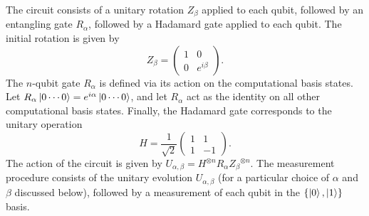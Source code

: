 \documentclass[amsmath,amssymb,superscriptaddress,twocolumn,pra]{revtex4-1}
\begin{document}
The circuit consists of a unitary rotation $Z_{\beta}$ applied to each qubit, followed by an entangling gate $R_{\alpha}$, followed by a Hadamard gate applied to each qubit. The initial rotation is given by
\begin{equation}
Z_\beta = \begin{pmatrix}1 & 0 \\ 0 & e^{i\beta}\end{pmatrix}.
\end{equation}
The $n$-qubit gate $R_\alpha$ is defined via its action on the computational basis states. Let $R_\alpha\ket{0\dotsm0} = e^{i\alpha}\ket{0\dotsm0}$, and let $R_\alpha$ act as the identity on all other computational basis states. Finally, the Hadamard gate corresponds to the unitary operation
\begin{equation}
H = \frac{1}{\sqrt 2}\begin{pmatrix}1 & 1 \\ 1 & -1\end{pmatrix}.
\end{equation}
The action of the circuit is given by $U_{\alpha,\beta} = H^{\otimes n} R_\alpha {Z_\beta}^{\otimes n}$.
The measurement procedure consists of the unitary evolution $U_{\alpha, \beta}$ (for a particular choice of $\alpha$ and $\beta$ discussed below), followed by a measurement of each qubit in the $\{\ket{0},\ket{1}\}$ basis.
\end{document}
